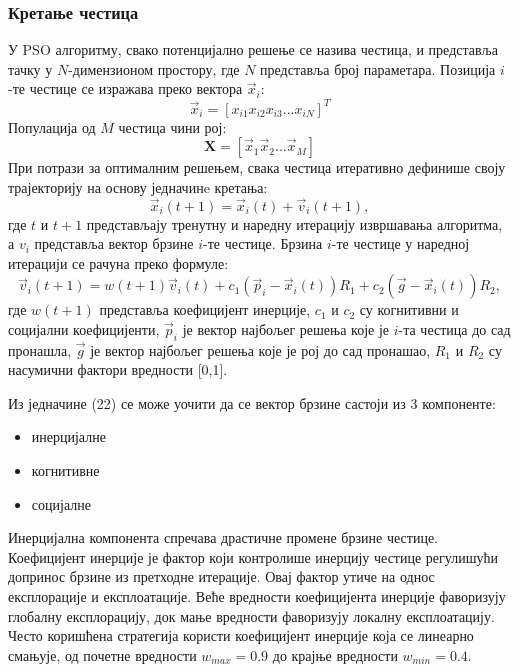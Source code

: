 \documentclass[12pt]{article}
\begin{document}
\subsubsection{Кретање честица}
У PSO алгоритму, свако потенцијално решење се назива честица, и представља тачку у $N$-димензионом простору, где $N$ представља број параметара. Позиција $i$-те честице се изражава преко вектора $\vec x_i$:
\begin{equation}
    \vec x_i = [x_{i1} x_{i2} x_{i3}... x_{iN}]^T
\end{equation}
Популација од $M$ честица чини рој:
\begin{equation}
    \textbf{X} = [\vec x_1 \vec x_2 ... \vec x_M]
\end{equation}
При потрази за оптималним решењем, свака честица итеративно дефинише своју трајекторију на основу једначинe кретања:
\begin{equation}
    \vec x_i(t+1) = \vec x_i(t) +\vec v_i(t+1),
\end{equation}
где $t$ и $t+1$ представљају тренутну и наредну итерацију извршавања алгоритма, а $v_i$ представља вектор брзине $i$-те честице. Брзина $i$-те честице у наредној итерацији се рачуна преко формуле:
\begin{equation}
    \vec v_i(t+1) = w(t+1)\vec v_i(t) + c_1(\vec p_i- \vec x_i(t))R_1 + c_2(\vec g- \vec x_i(t))R_2,
\end{equation}
где $w(t+1)$ представља коефицијент инерције, $c_1$ и $c_2$ су когнитивни и социјални коефицијенти, $\vec p_i$ је вектор најбољег решења које је $i$-та честица до сад пронашла, $\vec{g}$ је вектор најбољег решења које је рој до сад пронашао,  $R_1$ и $R_2$ су насумични фактори вредности [0,1].

Из једначине (22) се може уочити да се вектор брзине састоји из 3 компоненте:
\begin{itemize}
    \item инерцијалне
    \item когнитивне
    \item социјалне
\end{itemize}
Инерцијална компонента спречава драстичне промене брзине честице. Коефицијент инерције је фактор који контролише инерцију честице регулишући допринос брзине из претходне итерације. Овај фактор утиче на однос експлорације и експлоатације. Веће вредности коефицијента инерције фаворизују глобалну експлорацију, док мање вредности фаворизују локалну експлоатацију. Често коришћена стратегија користи коефицијент инерције која се линеарно смањује, од почетне вредности $w_{max}=0.9$ до крајње вредности $w_{min}=0.4$.
\end{document}
